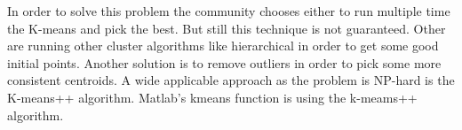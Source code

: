 In order to solve this problem the community chooses either to run multiple time the K-means and
pick the best. But still this technique is not guaranteed. Other are running other cluster algorithms
like hierarchical in order to get some good initial points. Another solution is to remove outliers
in order to pick some more consistent centroids. A wide applicable approach as the problem is NP-hard
is the K-means++ algorithm. Matlab's kmeans function is using the k-meams++ algorithm.
